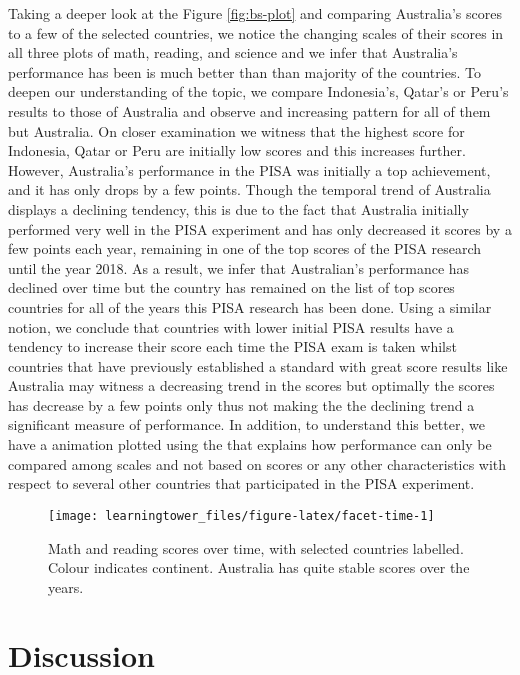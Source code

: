 Taking a deeper look at the Figure \ref{fig:bs-plot} and comparing Australia's scores to a few of the selected countries, we notice the changing scales of their scores in all three plots of math, reading, and science and we infer that Australia's performance has been is much better than than majority of the countries. To deepen our understanding of the topic, we compare Indonesia's, Qatar's or Peru's results to those of Australia and observe and increasing pattern for all of them but Australia. On closer examination we witness that the highest score for Indonesia, Qatar or Peru are initially low scores and this increases further. However, Australia's performance in the PISA was initially a top achievement, and it has only drops by a few points. Though the temporal trend of Australia displays a declining tendency, this is due to the fact that Australia initially performed very well in the PISA experiment and has only decreased it scores by a few points each year, remaining in one of the top scores of the PISA research until the year 2018. As a result, we infer that Australian's performance has declined over time but the country has remained on the list of top scores countries for all of the years this PISA research has been done. Using a similar notion, we conclude that countries with lower initial PISA results have a tendency to increase their score each time the PISA exam is taken whilst countries that have previously established a standard with great score results like Australia may witness a decreasing trend in the scores but optimally the scores has decrease by a few points only thus not making the the declining trend a significant measure of performance. In addition, to understand this better, we have a animation plotted using  \citep{gganimate} the that explains how performance can only be compared among scales and not based on scores or any other characteristics with respect to several other countries that participated in the PISA experiment.

\begin{figure}
\texttt{[image: learningtower\_files/figure-latex/facet-time-1]} \caption{Math and reading scores over time, with selected countries labelled. Colour indicates continent. Australia has quite stable scores over the years.}\label{fig:facet-time}
\end{figure}

\section{Discussion}\label{discussion}

